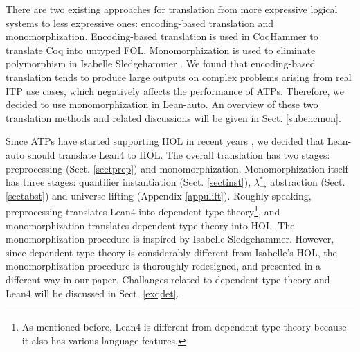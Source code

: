   There are two existing approaches for translation from more expressive
  logical systems to less expressive ones: encoding-based translation and monomorphization.
  Encoding-based translation is used in CoqHammer \cite{Czajka2018HammerFC}
  to translate Coq into untyped FOL. Monomorphization is used to
  eliminate polymorphism in Isabelle Sledgehammer \cite{Blanchette2016HammeringTQ,MonoPaper,Paulson2012ThreeYO}.
  We found that encoding-based translation tends to produce large outputs
  on complex problems arising from real ITP use cases, which negatively affects the performance of ATPs.
  Therefore, we decided to use monomorphization in Lean-auto. An overview of these two
  translation methods and related discussions will be given in Sect. \ref{subencmon}.

  Since ATPs have started supporting HOL in recent years \cite{HOVampire,ZipperpositionMakeWork,HOEProver},
  we decided that Lean-auto should translate Lean4 to HOL. The overall translation has
  two stages: preprocessing (Sect. \ref{sectprep}) and monomorphization.
  Monomorphization itself has three stages: quantifier instantiation (Sect. \ref{sectinst}),
  $\lambda_\to^*$ abstraction (Sect. \ref{sectabst}) and universe lifting (Appendix \ref{appulift}).
  Roughly speaking, preprocessing translates Lean4 into dependent type
  theory\footnote{As mentioned before, Lean4 is different from
  dependent type theory because it also has various language features.},
  and monomorphization translates dependent type theory into HOL.
  The monomorphization procedure is inspired by Isabelle Sledgehammer.
  However, since dependent type theory is considerably different from
  Isabelle's HOL, the monomorphization procedure is thoroughly redesigned,
  and presented in a different way in our paper. Challanges related to
  dependent type theory and Lean4 will be discussed in Sect. \ref{exqdet}.